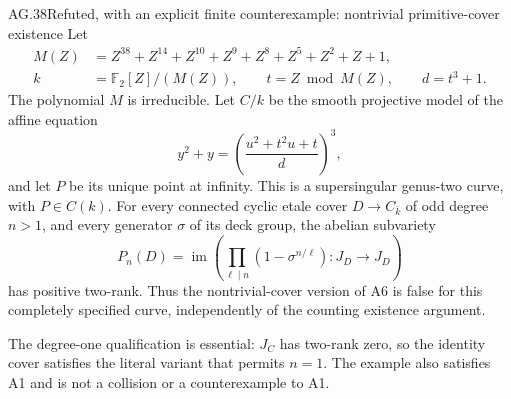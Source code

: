 \begin{claim}{AG.38}{Refuted, with an explicit finite counterexample: nontrivial primitive-cover existence}
\label{clm:AGexplicitprimitivecounterexample}
Let
\[
 \begin{split}
 M(Z)&=Z^{38}+Z^{14}+Z^{10}+Z^9+Z^8+Z^5+Z^2+Z+1,\\
 k&=\mathbb F_2[Z]/(M(Z)),\qquad t=Z\bmod M(Z),
 \qquad d=t^3+1.
 \end{split}                                                    \tag{AG.38.1}
\]
The polynomial \(M\) is irreducible. Let \(C/k\) be the smooth
projective model of the affine equation
\[
             y^2+y=\left(\frac{u^2+t^2u+t}{d}\right)^3,
                                                               \tag{AG.38.2}
\]
and let \(P\) be its unique point at infinity. This is a
supersingular genus-two curve, with \(P\in C(k)\).
For every connected cyclic etale cover
\(D\to C_{\bar k}\) of odd degree \(n>1\), and every generator
\(\sigma\) of its deck group, the abelian subvariety
\[
 P_n(D)=\operatorname{im}\left(
       \prod_{\ell\mid n}(1-\sigma^{n/\ell}):J_D\longrightarrow J_D
                              \right)
\]
has positive two-rank. Thus the nontrivial-cover version of A6 is
false for this completely specified curve, independently of the
counting existence argument.

The degree-one qualification is essential: \(J_C\) has two-rank
zero, so the identity cover satisfies the literal variant that
permits \(n=1\). The example also satisfies A1 and is not a
collision or a counterexample to A1.
\end{claim}

